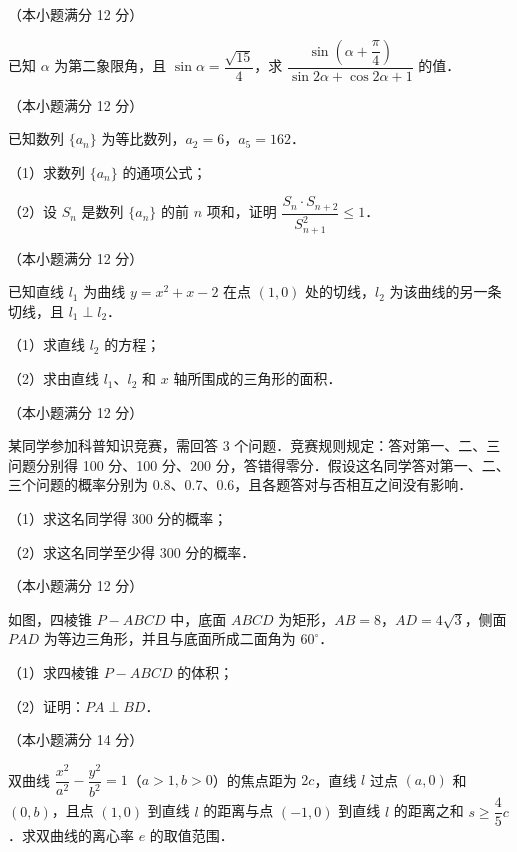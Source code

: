 \begin{question}
（本小题满分 12 分）

已知 $\alpha$ 为第二象限角，且 $\sin\alpha=\dfrac{\sqrt{15}}{4}$，求 $\dfrac{\sin\left(\alpha+\dfrac{\pi}{4}\right)}{\sin 2\alpha+\cos 2\alpha+1}$ 的值．

\end{question}
\begin{question}
（本小题满分 12 分）

已知数列 $\{a_n\}$ 为等比数列，$a_2=6$，$a_5=162$．

（1）求数列 $\{a_n\}$ 的通项公式；

（2）设 $S_n$ 是数列 $\{a_n\}$ 的前 $n$ 项和，证明 $\dfrac{S_n\cdot S_{n+2}}{S_{n+1}^2}\leqslant 1$．

\end{question}
\begin{question}
（本小题满分 12 分）

已知直线 $l_1$ 为曲线 $y=x^2+x-2$ 在点 $(1,0)$ 处的切线，$l_2$ 为该曲线的另一条切线，且 $l_1\perp l_2$．

（1）求直线 $l_2$ 的方程；

（2）求由直线 $l_1$、$l_2$ 和 $x$ 轴所围成的三角形的面积．

\end{question}
\begin{question}
（本小题满分 12 分）

某同学参加科普知识竞赛，需回答 3 个问题．竞赛规则规定：答对第一、二、三问题分别得 100 分、100 分、200 分，答错得零分．假设这名同学答对第一、二、三个问题的概率分别为 0.8、0.7、0.6，且各题答对与否相互之间没有影响．

（1）求这名同学得 300 分的概率；

（2）求这名同学至少得 300 分的概率．

\Needspace{0.4\textheight}
\end{question}
\begin{question}
（本小题满分 12 分）

如图，四棱锥 $P-ABCD$ 中，底面 $ABCD$ 为矩形，$AB=8$，$AD=4\sqrt{3}$，侧面 $PAD$ 为等边三角形，并且与底面所成二面角为 $60^\circ$．
\nopagebreak[4]
\begin{center}\end{center}
\nopagebreak[4]
（1）求四棱锥 $P-ABCD$ 的体积；

（2）证明：$PA\perp BD$．

\end{question}
\begin{question}
（本小题满分 14 分）

双曲线 $\dfrac{x^2}{a^2}-\dfrac{y^2}{b^2}=1$（$a>1,b>0$）的焦点距为 $2c$，直线 $l$ 过点 $(a,0)$ 和 $(0,b)$，且点 $(1,0)$ 到直线 $l$ 的距离与点 $(-1,0)$ 到直线 $l$ 的距离之和 $s\geqslant\dfrac{4}{5}c$．求双曲线的离心率 $e$ 的取值范围．

\end{question}